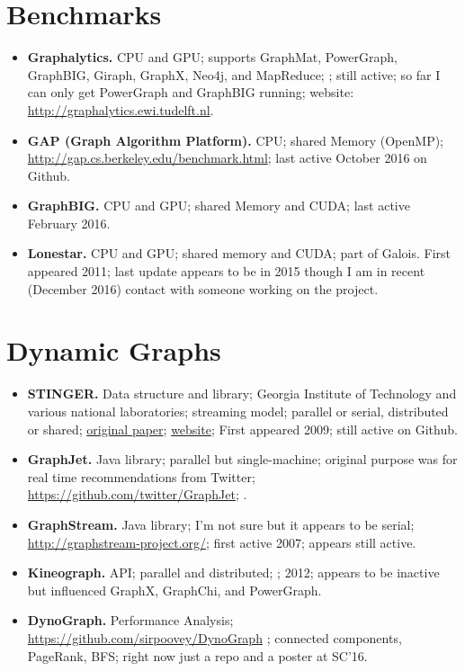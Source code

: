 \documentclass[11pt]{article}
\begin{document}
\section{Benchmarks}
\begin{itemize}
	\item \textbf{Graphalytics.} CPU and GPU; supports GraphMat, PowerGraph, GraphBIG, Giraph, GraphX, Neo4j, and MapReduce; \cite{Capota:2015:Graphalytics}; still active; so far I can only get PowerGraph and GraphBIG running; website: \url{http://graphalytics.ewi.tudelft.nl}.

	\item \textbf{GAP (Graph Algorithm Platform).} CPU; shared Memory (OpenMP); \url{http://gap.cs.berkeley.edu/benchmark.html}; last active October 2016 on Github. \cite{Beamer:2015:GAPBench}

	\item \textbf{GraphBIG.} CPU and GPU; shared Memory and CUDA; last active February 2016.

	\item \textbf{Lonestar.} CPU and GPU; shared memory and CUDA; part of Galois. First appeared 2011; last update appears to be in 2015 though I am in recent (December 2016) contact with someone working on the project.
\end{itemize}

\section{Dynamic Graphs}
\begin{itemize}
	\item \textbf{STINGER.} Data structure and library; Georgia Institute of Technology and various national laboratories; streaming model; parallel or serial, distributed or shared; \href{http://cass-mt.pnnl.gov/docs/pubs/pnnlgeorgiatechsandiastinger-u.pdf}{original paper}; \href{http://www.stingergraph.com/}{website}; First appeared 2009; still active on Github.

	\item \textbf{GraphJet.} Java library; parallel but single-machine; original purpose was for real time recommendations from Twitter; \url{https://github.com/twitter/GraphJet}; \cite{Sharma:2016:GraphJet}.

	\item \textbf{GraphStream.} Java library; I'm not sure but it appears to be serial; \url{http://graphstream-project.org/}; \cite{Dutot:2007:GraphStream} first active 2007; appears still active.

	\item \textbf{Kineograph.} API; parallel and distributed; \cite{Cheng:2012:Kineograph}; 2012; appears to be inactive but influenced GraphX, GraphChi, and PowerGraph.

	\item \textbf{DynoGraph.} Performance Analysis; \url{https://github.com/sirpoovey/DynoGraph} \cite{Hein:2016:DynoGraph}; connected components, PageRank, BFS; right now just a repo and a poster at SC'16.
\end{itemize}
\end{document}
